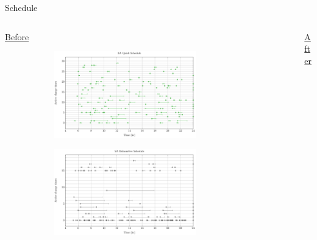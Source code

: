 \documentclass[aspectratio=169,dvipsnames]{beamer}
\begin{document}
\begin{frame}[label={sec:org797453d}]{Schedule}
\begin{columns}
\begin{column}{0.5\columnwidth}
\begin{center} {\small \underline{Before}}\end{center}

\begin{figure}[htpb]
\begin{subfigure}[t]{\textwidth}
\centering
    \includegraphics[width=0.75\textwidth]{img/sa-pap-paper-bad/schedule-sa-quick}
\end{subfigure}
\begin{subfigure}[t]{\textwidth}
\centering
    \includegraphics[width=0.75\textwidth]{img/sa-pap-paper-bad/schedule-sa-heuristic}
\end{subfigure}
\end{figure}
\end{column}

\begin{column}{0.5\columnwidth}
\begin{center} {\small \underline{After}}\end{center}


\end{column}
\end{columns}
\end{frame}
\end{document}
